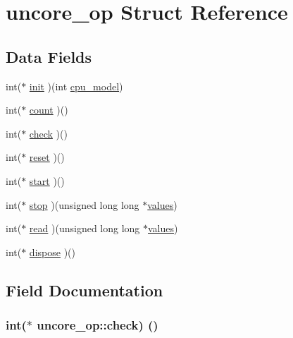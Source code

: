 \hypertarget{structuncore__op}{}\section{uncore\+\_\+op Struct Reference}
\label{structuncore__op}
\subsection*{Data Fields}
\begin{DoxyCompactItemize}
\item 
int($\ast$ \hyperlink{structuncore__op_a8a3c691983021d4ec3df44316b9a9e00}{init} )(int \hyperlink{test__architecture_8c_acfede048b49209a0d8f7d773aa176e65}{cpu\+\_\+model})
\item 
int($\ast$ \hyperlink{structuncore__op_a18b27fb33f2be6c8c70111ba05cc46f8}{count} )()
\item 
int($\ast$ \hyperlink{structuncore__op_af2f2af6686f623303b83ce67bdb496e7}{check} )()
\item 
int($\ast$ \hyperlink{structuncore__op_af676de4c6eba45a665865061cdc74072}{reset} )()
\item 
int($\ast$ \hyperlink{structuncore__op_ab2c6085afde0ef4aa7893038e1b36606}{start} )()
\item 
int($\ast$ \hyperlink{structuncore__op_abd40e6ba8c4083702d5704a921d5f087}{stop} )(unsigned long long $\ast$\hyperlink{energy__cpu_8c_ab805d4eab86acb3d624dd5b16f94db88}{values})
\item 
int($\ast$ \hyperlink{structuncore__op_ad2df8248f66329c66239d33ee5456456}{read} )(unsigned long long $\ast$\hyperlink{energy__cpu_8c_ab805d4eab86acb3d624dd5b16f94db88}{values})
\item 
int($\ast$ \hyperlink{structuncore__op_a6f01675c13274c88ded83d277f48d451}{dispose} )()
\end{DoxyCompactItemize}


\subsection{Field Documentation}
\subsubsection[{\texorpdfstring{check}{check}}]{\setlength{\rightskip}{0pt plus 5cm}int($\ast$ uncore\+\_\+op\+::check) ()}\hypertarget{structuncore__op_af2f2af6686f623303b83ce67bdb496e7}{}\label{structuncore__op_af2f2af6686f623303b83ce67bdb496e7}
